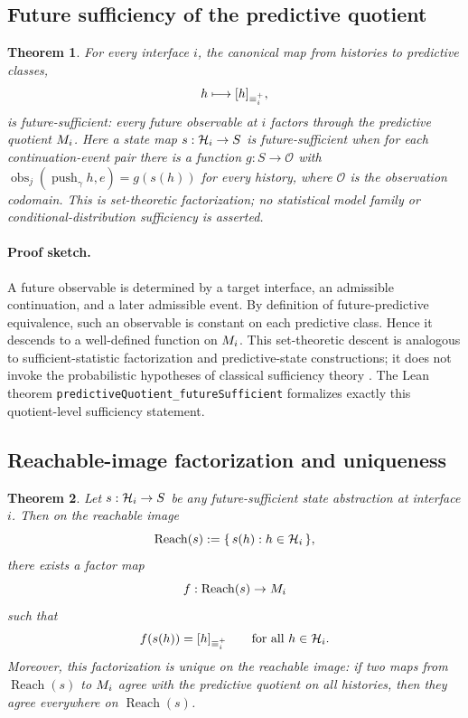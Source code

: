 \documentclass[11pt]{article}
\newtheorem{theorem}{Theorem}[section]
\theoremstyle{definition}
\begin{document}
\subsection{Future sufficiency of the predictive quotient}\label{subsec:thm-sufficiency}
\begin{theorem}\label{thm:future-sufficient}
For every interface $i$, the canonical map from histories to predictive classes,
\[
h \longmapsto [h]_{\equiv^{+}_i},
\]
is future-sufficient: every future observable at $i$ factors through the predictive quotient $M_i$. Here a state map $s:\mathcal{H}_i\to S$ is future-sufficient when for each continuation-event pair there is a function $g:S\to\mathcal{O}$ with $\operatorname{obs}_j(\operatorname{push}_{\gamma}h,e)=g(s(h))$ for every history, where $\mathcal{O}$ is the observation codomain. This is set-theoretic factorization; no statistical model family or conditional-distribution sufficiency is asserted.
\end{theorem}

\paragraph{Proof sketch.}
A future observable is determined by a target interface, an admissible continuation, and a later admissible event. By definition of future-predictive equivalence, such an observable is constant on each predictive class. Hence it descends to a well-defined function on $M_i$. This set-theoretic descent is analogous to sufficient-statistic factorization and predictive-state constructions; it does not invoke the probabilistic hypotheses of classical sufficiency theory \citep{LehmannCasella1998TheoryPointEstimation,Jaeger2000ObservableOperatorModels,ShaliziCrutchfield2001ComputationalMechanics}. The Lean theorem \nolinkurl{predictiveQuotient_futureSufficient} formalizes exactly this quotient-level sufficiency statement.

\subsection{Reachable-image factorization and uniqueness}\label{subsec:thm-factorization}
\begin{theorem}\label{thm:reachable-factorization}
Let $s : \mathcal{H}_i \to S$ be any future-sufficient state abstraction at interface $i$. Then on the reachable image
\[
\operatorname{Reach}(s) := \{\,s(h) : h\in\mathcal{H}_i\,\},
\]
there exists a factor map
\[
f : \operatorname{Reach}(s) \to M_i
\]
such that
\[
f(s(h)) = [h]_{\equiv^{+}_i}
\qquad
\text{for all } h\in\mathcal{H}_i.
\]
Moreover, this factorization is unique on the reachable image: if two maps from $\operatorname{Reach}(s)$ to $M_i$ agree with the predictive quotient on all histories, then they agree everywhere on $\operatorname{Reach}(s)$.
\end{theorem}
\end{document}
